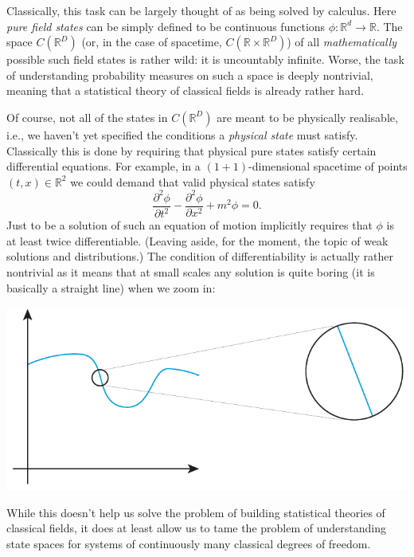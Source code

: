 \documentclass[11pt]{amsart}
\theoremstyle{plain}%
\theoremstyle{definition}
\theoremstyle{remark}
\begin{document}
Classically, this task can be largely thought of as being solved by calculus. Here \emph{pure field states} can be simply defined to be continuous functions $\phi:\mathbb{R}^d\rightarrow \mathbb{R}$. The space $C(\mathbb{R}^D)$ (or, in the case of spacetime, $C(\mathbb{R}\times\mathbb{R}^D)$) of all \emph{mathematically} possible such field states is rather wild: it is uncountably infinite. Worse, the task of understanding probability measures on such a space is deeply nontrivial, meaning that a statistical theory of classical fields is already rather hard.

Of course, not all of the states in $C(\mathbb{R}^D)$ are meant to be physically realisable, i.e., we haven't yet specified the conditions a \emph{physical state} must satisfy. Classically this is done by requiring that physical pure states satisfy certain differential equations. For example, in a $(1+1)$-dimensional spacetime of points $(t,x)\in \mathbb{R}^2$ we could demand that valid physical states satisfy
\begin{equation}
	\frac{\partial^2\phi}{\partial t^2} - \frac{\partial^2\phi}{\partial x^2} + m^2\phi = 0.
\end{equation}
Just to be a solution of such an equation of motion implicitly requires that $\phi$ is at least twice differentiable. (Leaving aside, for the moment, the topic of weak solutions and distributions.) The condition of differentiability is actually rather nontrivial as it means that at small scales any solution is quite boring (it is basically a straight line) when we zoom in:
\begin{center}
\includegraphics{difffunc.pdf}
\end{center}
While this doesn't help us solve the problem of building statistical theories of classical fields, it does at least allow us to tame the problem of understanding state spaces for systems of continuously many classical degrees of freedom. 
\end{document}
